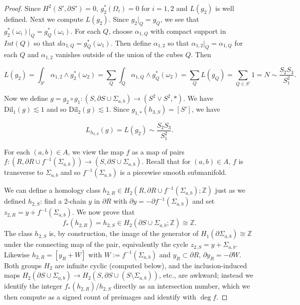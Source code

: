 \documentclass{amsart}
\newtheorem*{theorem 1}{Theorem 1}
\newtheorem*{theorem 2}{Theorem 2}
\newtheorem*{theorem 3}{Theorem 3}
\numberwithin{equation}{section}
\newcommand{\Dil}{\textrm{Dil}}
\newcommand{\ZZ}{\mathbb{Z}}
\begin{document}
\begin{proof}
Since $H^2(S',  \partial S') = 0$,  $g_2^*(\Omega_i) = 0$ for $i=1,2$ and $L(g_2)$ is well defined.   Next we compute $L(g_2)$.   Since $g_2 |_Q = g_Q$,  we see that $g_2^*(\omega_i) |_Q = g_Q^*(\omega_i)$.   For each $Q$,  choose $\alpha_{1,Q}$ with compact support in $Int(Q)$ so that $d \alpha_{1,Q} = g_Q^{*}(\omega_1)$.   Then define $\alpha_{1,2}$ so that $\alpha_{1,2} |_Q = \alpha_{1,Q}$ for each $Q$ and $\alpha_{1,2}$ vanishes outside of the union of the cubes $Q$.    Then

$$ L(g_2) = \int_{S'} \alpha_{1,2} \wedge g_2^*(\omega_2) = \sum_{Q} \int_Q \alpha_{1,Q} \wedge g_Q^*(\omega_2) = \sum_{Q} L(g_Q) = \sum_{Q \in S'} 1 = N \sim \frac{S_2 S_3}{S_1^2}. $$

Now we define $g = g_2 \circ g_1: (S,  \partial S \cup \Sigma_{a,b}) \rightarrow (S^2 \vee S^2,  *)$.    We have $\Dil_1(g) \lesssim 1$ and so $\Dil_2(g) \lesssim 1$.   Since $g_{1, *}(h_{3,S}) = [S']$,  we have

\begin{equation}  L_{h_{3,S}}(g)  = L(g_2) \sim \frac{S_2 S_3}{S_1^2}.   \end{equation}

For each $(a,b) \in A$, we view the map $f$ as a map of pairs $f: (R,  \partial R \cup f^{-1} (\Sigma_{a,b})) \rightarrow (S,  \partial S \cup \Sigma_{a,b})$.   Recall that for $(a,b) \in A$,  $f$ is transverse to $\Sigma_{a,b}$ and so $f^{-1}(\Sigma_{a,b})$ is a piecewise smooth submanifold.    

We can define a homology class $h_{2,R} \in H_2(R,  \partial R \cup f^{-1}(\Sigma_{a,b}); \ZZ)$ just as we defined $h_{2,S}$: find a 2-chain $y$ in $\partial R$ with $\partial y = - \partial f^{-1}(\Sigma_{a,b})$ and set $z_{2,R} = y + f^{-1}(\Sigma_{a,b})$.   We now prove that
\begin{equation} \label{f2deg}
f_*(h_{2,R}) = h_{2,S} \in H_2(\partial S\cup\Sigma_{a,b};\ZZ) \cong \ZZ.
\end{equation}
The class $h_{2,S}$ is, by construction, the image of the generator of $H_1(\partial\Sigma_{a,b})\cong\ZZ$ under the connecting map of the pair, equivalently the cycle $z_{2,S}=y+\Sigma_{a,b}$.  Likewise $h_{2,R}=[y_R + W]$ with $W:=f^{-1}(\Sigma_{a,b})$ and $y_R\subset\partial R$, $\partial y_R=-\partial W$.  Both groups $H_2$ are infinite cyclic (computed below), and the inclusion-induced maps $H_2(\partial S\cup\Sigma_{a,b})\to H_2(S,\partial S\cup(S\setminus\Sigma_{a,b}))$, etc., are awkward; instead we identify the integer $f_*(h_{2,R})/h_{2,S}$ directly as an intersection number, which we then compute as a signed count of preimages and identify with $\deg f$.


\end{proof}
\end{document}
